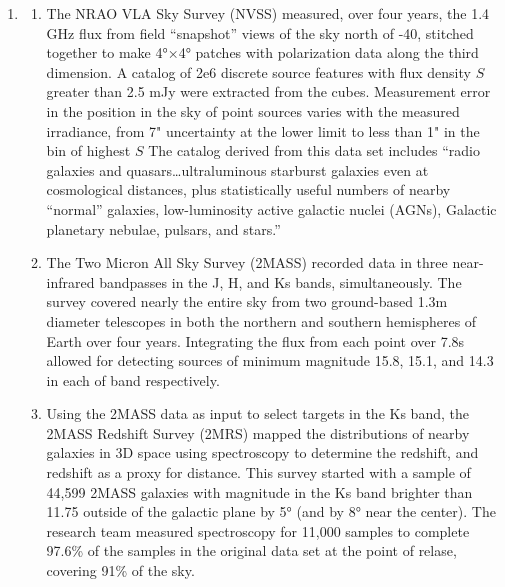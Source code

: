 \documentclass{paper}
\begin{document}
\begin{enumerate}
  \pagebreak \item %
    \begin{enumerate}
      \item
        The NRAO VLA Sky Survey (NVSS) measured, over four years, the 1.4 
        GHz flux from field ``snapshot'' views of the sky north of -40, 
        stitched together to make 4°×4° patches with polarization data along 
        the third dimension. A catalog of 2e6 discrete source features with 
        flux density \(S\) greater than 2.5 mJy were extracted from the cubes. 
        Measurement error in the position in the sky of point sources varies 
        with the measured irradiance, from 7" uncertainty at the lower limit 
        to less than 1" in the bin of highest \(S\) The catalog derived from
        this data set includes ``radio galaxies and quasars\ldots ultraluminous 
        starburst galaxies even at cosmological distances, plus statistically 
        useful numbers of nearby ``normal'' galaxies, low-luminosity 
        active galactic nuclei (AGNs), Galactic planetary nebulae, pulsars, 
        and stars.''\cite{Condon_1998}

      \item
        The Two Micron All Sky Survey (2MASS) recorded data in three 
        near-infrared bandpasses in the J, H, and Ks bands, simultaneously. 
        The survey covered nearly the entire sky from two ground-based 1.3m 
        diameter telescopes in both the northern and southern hemispheres of
        Earth over four years. Integrating the flux from each point over 7.8s 
        allowed for detecting sources of minimum magnitude 15.8, 15.1, and 
        14.3 in each of band respectively.\cite{Skrutskie_2006}

      \item
        Using the 2MASS data as input to select targets in the Ks band, the
        2MASS Redshift Survey (2MRS) mapped the distributions of nearby
        galaxies in 3D space using spectroscopy to determine the redshift, 
        and redshift as a proxy for distance. This survey started with a 
        sample of 44,599 2MASS galaxies with magnitude in the Ks band  
        brighter than 11.75 outside of the galactic plane by 5° (and by 8°
        near the center). The research team measured spectroscopy for 11,000
        samples to complete 97.6\% of the samples in the original data set at 
        the point of relase, covering 91\% of the sky.\cite{Huchra_2012}

    \end{enumerate}


\end{enumerate}
\end{document}
